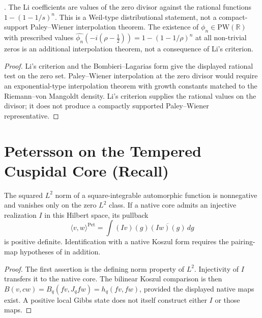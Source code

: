 \begin{proposition}
\label{v4-arith:w5-a:prop:li-via-weil}
\ClaimStatusProvedHere. The Li coefficients are values of the
zero divisor against the rational functions \(1-(1-1/s)^n\). This is a
Weil-type distributional statement, not a compact-support Paley--Wiener
interpolation theorem. The existence of
\(\phi_n\in\mathrm{PW}(\mathbb R)\) with
prescribed values
\(\widehat{\phi_n}(-i(\rho-\tfrac12))=1-(1-1/\rho)^n\) at all
non-trivial zeros is an additional interpolation theorem, not a
consequence of Li's criterion.
\end{proposition}

\begin{proof}
Li's criterion and the Bombieri--Lagarias form give the displayed
rational test on the zero set. Paley--Wiener interpolation at the zero
divisor would require an exponential-type interpolation theorem with
growth constants matched to the Riemann--von Mangoldt density. Li's
criterion supplies the rational values on the divisor; it does not
produce a compactly supported Paley--Wiener representative.
\end{proof}

\section{Petersson on the Tempered Cuspidal Core (Recall)}
\label{v4-arith:w5-a:petersson}

\begin{theorem}
\label{v4-arith:w5-a:thm:petersson-positive}
The squared $L^2$ norm of a square-integrable automorphic
function is nonnegative and vanishes only on the zero $L^2$
class. If a native core admits an injective realization $I$
in this Hilbert space, its pullback
\begin{equation}
 \langle v,w\rangle^{\mathrm{Pet}}
       =\int (Iv)(g)\overline{(Iw)(g)}\,dg
 \label{v4-arith:w5-a:eq:petersson}
\end{equation}
is positive definite. Identification with a native Koszul form
requires the pairing-map hypotheses of
 in addition.
\end{theorem}
\begin{proof}
The first assertion is the defining norm property of $L^2$.
Injectivity of $I$ transfers it to the native core. The bilinear
Koszul comparison is then
$B(v,cw)=B_q(fv,J_qfw)=h_q(fv,fw)$, provided the displayed
native maps exist. A positive local Gibbs state does not itself
construct either $I$ or those maps.
\end{proof}

